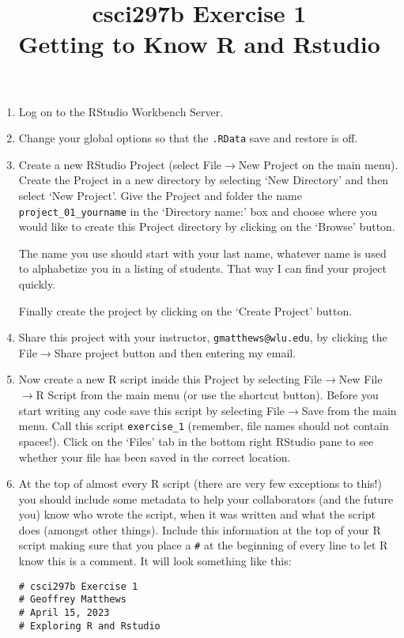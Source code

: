 \documentclass[12pt]{article}
\title{csci297b Exercise 1\\ Getting to Know R and Rstudio}
\date{}
\newcommand{\arrow}{\ensuremath{\rightarrow}}
\begin{document}
\maketitle

\begin{enumerate}

\item Log on to the RStudio Workbench Server. 

\item Change your global options so that the {\tt .RData} save and restore is off.

\item
Create a new RStudio Project (select File\arrow New Project on the main menu). Create the Project in a new directory by selecting ‘New Directory’ and then select ‘New Project’. Give the Project and folder the name \verb|project_01_yourname| in the ‘Directory name:’ box and 
choose where you would like to create this Project directory by clicking on the ‘Browse’ button.

The name you use should start with your last name, whatever name is used to alphabetize
you in a listing of students.  That way I can find your project quickly.

 Finally create the project by clicking on the ‘Create Project’ button. 

\item Share this project with your instructor, \verb|gmatthews@wlu.edu|, by
clicking the File\arrow Share project button and then entering my email.
 

\item Now create a new R script inside this Project by selecting File\arrow New File\arrow R Script from the main menu (or use the shortcut button). Before you start writing any code save this script by selecting File\arrow Save from the main menu. Call this script \verb|exercise_1|  (remember, file names should not contain spaces!). Click on the ‘Files’ tab in the bottom right RStudio pane to see whether your file has been saved in the correct location.

\item At the top of almost every R script (there are very few exceptions to this!) you should include some metadata to help your collaborators (and the future you) know who wrote the script, when it was written and what the script does (amongst other things). Include this information at the top of your R script making sure that you place a \lstinline{#} at the beginning of every line to let R know this is a comment. 
It will look something like this:
\begin{lstlisting}
# csci297b Exercise 1
# Geoffrey Matthews
# April 15, 2023
# Exploring R and Rstudio
\end{lstlisting}


\end{enumerate}
\end{document}

